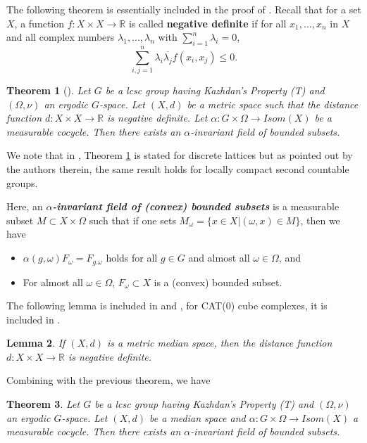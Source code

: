 \documentclass{amsart}
\numberwithin{equation}{section}
\newtheorem{thm}{Theorem}[section]
\newtheorem{lem}[thm]{Lemma}
\theoremstyle{definition}
\begin{document}
The following theorem is essentially included in the proof of \cite[Theorem 2.3]{AdamsSpatzier}. Recall that for a set $X$, a function $f: X \times X \to \mathbb{R}$ is called \textbf{negative definite} if for all $x_1,...,x_n$ in $X$ and all complex numbers $\lambda_1,...,\lambda_n$ with $\sum^n_{i=1}\lambda_i = 0$, $$\sum^n_{i,j =1 } \lambda_i\overline{\lambda_j}f(x_i,x_j) \leq 0.$$
\begin{thm}[\cite{AdamsSpatzier}]\label{thm_Adams-Spatzier}
    Let $G$ be a lcsc group having Kazhdan's Property (T) and $(\Omega,\nu)$ an ergodic $G$-space. Let $(X,d)$ be a metric space such that the distance function $d: X \times X \to \mathbb{R}$ is negative definite.  Let $\alpha: G \times \Omega \to Isom(X)$ be a measurable cocycle. Then there exists an $\alpha$-invariant field of bounded subsets.
\end{thm}\par 
We note that in \cite{AdamsSpatzier}, Theorem \ref{thm_Adams-Spatzier} is stated for discrete lattices but as pointed out by the authors therein, the same result holds for locally compact second countable groups.\par 
Here, an \textbf\textit{{$\alpha$-invariant field of (convex) bounded subsets}} is a measurable subset $M \subset X \times \Omega$ such that if one sets $M_{\omega} = \{ x \in X| (\omega, x) \in M\}$, then we have 
\begin{itemize}
    \item [(1)]$\alpha(g,\omega)F_{\omega} = F_{g.\omega}$ holds for all $g \in G$ and almost all $\omega \in \Omega$, and
    \item [(2)] For almost all $\omega \in \Omega$, $F_{\omega} \subset X$ is a (convex) bounded subset. 
\end{itemize}
The following lemma is included in \cite{nica2008groupactionsmedianspaces} and \cite{ChaDH_median}, for CAT(0) cube complexes, it is included in \cite{Niblo-Reeves}.
\begin{lem}
    If $(X,d)$ is a metric median space, then the distance function $d: X \times X \to \mathbb{R}$ is negative definite.
\end{lem}
Combining with the previous theorem, we have
\begin{thm}\label{thm:cocycle-propertyT}
    Let $G$ be a lcsc group having Kazhdan's Property (T) and $(\Omega,\nu)$ an ergodic $G$-space. Let $(X,d)$ be a median space and $\alpha: G \times \Omega \to Isom(X)$ a measurable cocycle. Then there exists an $\alpha$-invariant field of bounded subsets. 
\end{thm}
\end{document}
